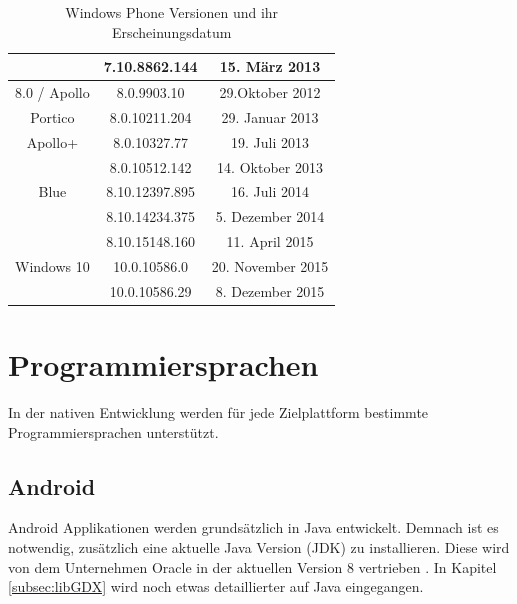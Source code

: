\begin{table}[htbp]
{\begin{tabular}{|c|c|c|}
			& 7.10.8862.144                           & 15. März 2013                                     \\ \hline
			8.0 / Apollo                             & 8.0.9903.10                             & 29.Oktober 2012                                   \\ \hline
			Portico                                  & 8.0.10211.204                           & 29. Januar 2013                                   \\ \hline
			Apollo+                                  & 8.0.10327.77                            & 19. Juli 2013                                     \\ \hline
			& 8.0.10512.142                           & 14. Oktober 2013                                  \\ \hline
			Blue                                     & 8.10.12397.895                          & 16. Juli 2014                                     \\ \hline
			& 8.10.14234.375                          & 5. Dezember 2014                                  \\ \hline
			& 8.10.15148.160                          & 11. April 2015                                    \\ \hline
			Windows 10                               & 10.0.10586.0                            & 20. November 2015                                 \\ \hline
			& 10.0.10586.29                           & 8. Dezember 2015                                  \\ \hline
		\end{tabular}
	}
	\caption{Windows Phone Versionen und ihr Erscheinungsdatum}
	\label{tab_WP_versions}\citep{WP7_version_releases, WP8_version_releases, WP10_version_releases}
\end{table}

\pagebreak

\section{Programmiersprachen}
In der nativen Entwicklung werden für jede Zielplattform bestimmte Programmiersprachen unterstützt. 

\subsection{Android}
Android Applikationen werden grundsätzlich in Java entwickelt. Demnach ist es notwendig, zusätzlich eine aktuelle Java Version (JDK) zu installieren. Diese wird von dem Unternehmen Oracle in der aktuellen Version 8  vertrieben \citep{java_jdk}. In Kapitel \ref{subsec:libGDX} wird noch etwas detaillierter auf Java eingegangen. 


